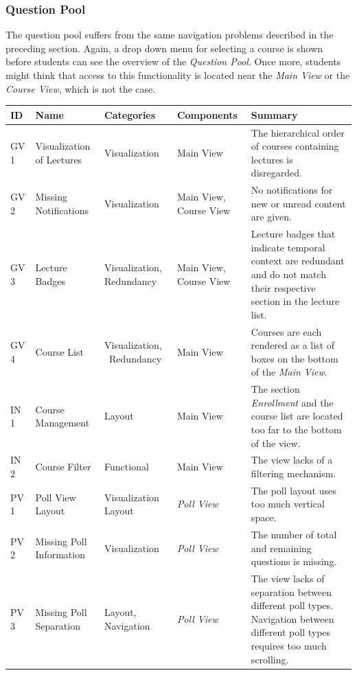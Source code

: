 \subsubsection{Question Pool}

The question pool suffers from the same navigation problems described in the preceding section. Again, a drop down menu for selecting a course is shown before students can see the overview of the \emph{Question Pool}. Once more, students might think that access to this functionality is located near the \emph{Main View} or the \emph{Course View}, which is not the case.
\cleardoublepage
\renewcommand*{\arraystretch}{1.4}
\begin{longtable}{ | p{1.1cm} | p{2cm} | p{2cm} | p{2.5cm} | p{5.5cm} |}
	\hline
	ID & Name & Categories & Components & Summary \\ \hline \hline
	GV 1 & Visualization of Lectures & Visualization & Main View & The hierarchical order of courses containing lectures is disregarded. \\ \hline
	GV 2 & Missing Notifications & Visualization & Main View, \newline Course View & No notifications for new or unread content are given. \\ \hline
	GV 3 & Lecture Badges & Visualization, \newline Redundancy & Main View, \newline Course View & Lecture badges that indicate temporal context are redundant and do not match their respective section in the lecture list. \\ \hline
	GV 4 & Course List & Visualization, \ Redundancy & Main View & Courses are each rendered as a list of boxes on the bottom of the \emph{Main View}. \\ \hline
	IN 1 & Course Management & Layout & Main View & The section \emph{Enrollment} and the course list are located too far to the bottom of the view. \\ \hline
	IN 2 & Course Filter & Functional & Main View & The view lacks of a filtering mechanism. \\ \hline
	PV 1 & Poll View Layout & Visualization \newline Layout & \emph{Poll View} & The poll layout uses too much vertical space. \\ \hline
	PV 2 & Missing Poll Information & Visualization & \emph{Poll View} & The number of total and remaining questions is missing. \\ \hline
	PV 3 & Missing Poll Separation & Layout, \newline Navigation & \emph{Poll View} & The view lacks of separation between different poll types. Navigation between different poll types requires too much scrolling. \\ \hline

\end{longtable}
